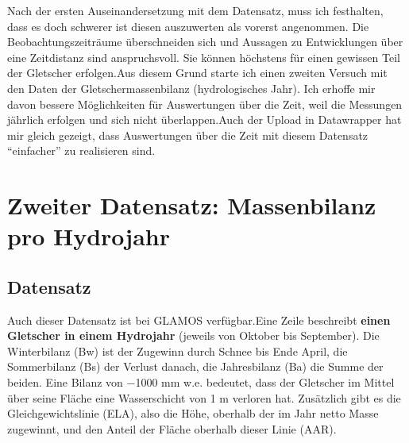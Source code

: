 \documentclass[
  nswissgerman,
  11pt,
  a4paper,
  DIV=11,
  numbers=noendperiod]{scrartcl}
\begin{document}
Nach der ersten Auseinandersetzung mit dem Datensatz, muss ich
festhalten, dass es doch schwerer ist diesen auszuwerten als vorerst
angenommen. Die Beobachtungszeiträume überschneiden sich und Aussagen zu
Entwicklungen über eine Zeitdistanz sind anspruchsvoll. Sie können
höchstens für einen gewissen Teil der Gletscher erfolgen.Aus diesem
Grund starte ich einen zweiten Versuch mit den Daten der
Gletschermassenbilanz (hydrologisches Jahr). Ich erhoffe mir davon
bessere Möglichkeiten für Auswertungen über die Zeit, weil die Messungen
jährlich erfolgen und sich nicht überlappen.Auch der Upload in
Datawrapper hat mir gleich gezeigt, dass Auswertungen über die Zeit mit
diesem Datensatz ``einfacher'' zu realisieren sind.

\section{Zweiter Datensatz: Massenbilanz pro
Hydrojahr}\label{zweiter-datensatz-massenbilanz-pro-hydrojahr}

\subsection{Datensatz}\label{datensatz}

Auch dieser Datensatz ist bei GLAMOS verfügbar.Eine Zeile beschreibt
\textbf{einen Gletscher in einem Hydrojahr} (jeweils von Oktober bis
September). Die Winterbilanz (Bw) ist der Zugewinn durch Schnee bis Ende
April, die Sommerbilanz (Bs) der Verlust danach, die Jahresbilanz (Ba)
die Summe der beiden. Eine Bilanz von −1000 mm w.e. bedeutet, dass der
Gletscher im Mittel über seine Fläche eine Wasserschicht von 1 m
verloren hat. Zusätzlich gibt es die Gleichgewichtslinie (ELA), also die
Höhe, oberhalb der im Jahr netto Masse zugewinnt, und den Anteil der
Fläche oberhalb dieser Linie (AAR).
\end{document}
